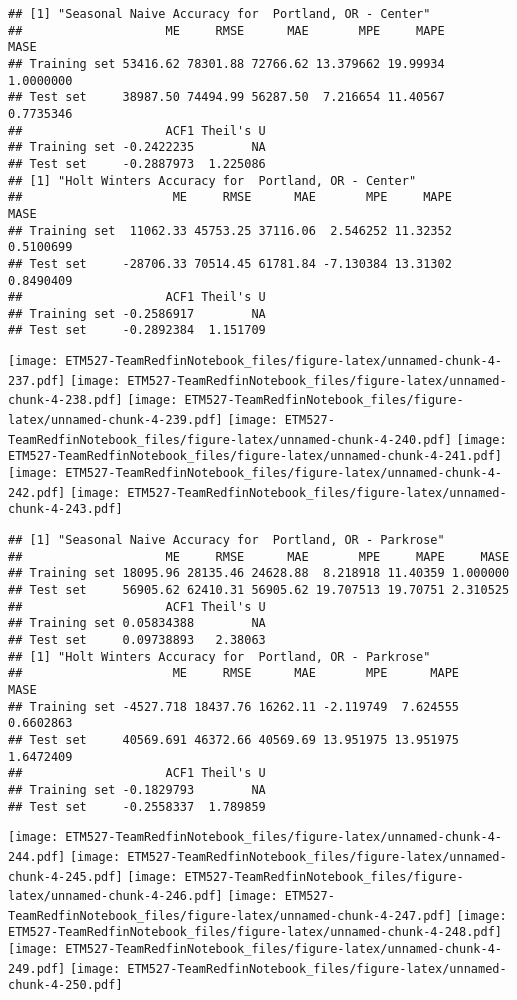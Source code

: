 \documentclass[]{article}
\begin{document}
\begin{verbatim}
## [1] "Seasonal Naive Accuracy for  Portland, OR - Center"
##                    ME     RMSE      MAE       MPE     MAPE      MASE
## Training set 53416.62 78301.88 72766.62 13.379662 19.99934 1.0000000
## Test set     38987.50 74494.99 56287.50  7.216654 11.40567 0.7735346
##                    ACF1 Theil's U
## Training set -0.2422235        NA
## Test set     -0.2887973  1.225086
## [1] "Holt Winters Accuracy for  Portland, OR - Center"
##                     ME     RMSE      MAE       MPE     MAPE      MASE
## Training set  11062.33 45753.25 37116.06  2.546252 11.32352 0.5100699
## Test set     -28706.33 70514.45 61781.84 -7.130384 13.31302 0.8490409
##                    ACF1 Theil's U
## Training set -0.2586917        NA
## Test set     -0.2892384  1.151709
\end{verbatim}

\texttt{[image: ETM527-TeamRedfinNotebook\_files/figure-latex/unnamed-chunk-4-237.pdf]}
\texttt{[image: ETM527-TeamRedfinNotebook\_files/figure-latex/unnamed-chunk-4-238.pdf]}
\texttt{[image: ETM527-TeamRedfinNotebook\_files/figure-latex/unnamed-chunk-4-239.pdf]}
\texttt{[image: ETM527-TeamRedfinNotebook\_files/figure-latex/unnamed-chunk-4-240.pdf]}
\texttt{[image: ETM527-TeamRedfinNotebook\_files/figure-latex/unnamed-chunk-4-241.pdf]}
\texttt{[image: ETM527-TeamRedfinNotebook\_files/figure-latex/unnamed-chunk-4-242.pdf]}
\texttt{[image: ETM527-TeamRedfinNotebook\_files/figure-latex/unnamed-chunk-4-243.pdf]}

\begin{verbatim}
## [1] "Seasonal Naive Accuracy for  Portland, OR - Parkrose"
##                    ME     RMSE      MAE       MPE     MAPE     MASE
## Training set 18095.96 28135.46 24628.88  8.218918 11.40359 1.000000
## Test set     56905.62 62410.31 56905.62 19.707513 19.70751 2.310525
##                    ACF1 Theil's U
## Training set 0.05834388        NA
## Test set     0.09738893   2.38063
## [1] "Holt Winters Accuracy for  Portland, OR - Parkrose"
##                     ME     RMSE      MAE       MPE      MAPE      MASE
## Training set -4527.718 18437.76 16262.11 -2.119749  7.624555 0.6602863
## Test set     40569.691 46372.66 40569.69 13.951975 13.951975 1.6472409
##                    ACF1 Theil's U
## Training set -0.1829793        NA
## Test set     -0.2558337  1.789859
\end{verbatim}

\texttt{[image: ETM527-TeamRedfinNotebook\_files/figure-latex/unnamed-chunk-4-244.pdf]}
\texttt{[image: ETM527-TeamRedfinNotebook\_files/figure-latex/unnamed-chunk-4-245.pdf]}
\texttt{[image: ETM527-TeamRedfinNotebook\_files/figure-latex/unnamed-chunk-4-246.pdf]}
\texttt{[image: ETM527-TeamRedfinNotebook\_files/figure-latex/unnamed-chunk-4-247.pdf]}
\texttt{[image: ETM527-TeamRedfinNotebook\_files/figure-latex/unnamed-chunk-4-248.pdf]}
\texttt{[image: ETM527-TeamRedfinNotebook\_files/figure-latex/unnamed-chunk-4-249.pdf]}
\texttt{[image: ETM527-TeamRedfinNotebook\_files/figure-latex/unnamed-chunk-4-250.pdf]}
\end{document}
